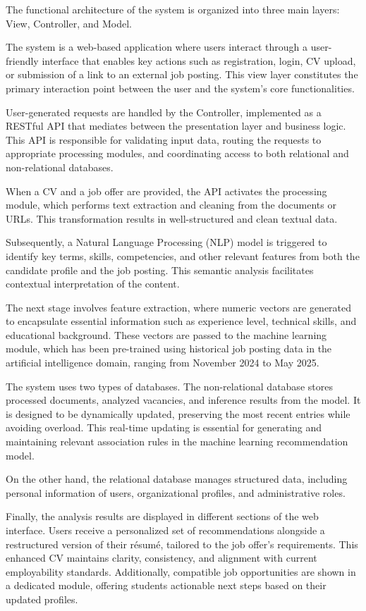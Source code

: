 \documentclass[runningheads]{llncs}
\begin{document}
	The functional architecture of the system is organized into three main layers: View, Controller, and Model.
	
	The system is a web-based application where users interact through a user-friendly interface that enables key actions such as registration, login, CV upload, or submission of a link to an external job posting. This view layer constitutes the primary interaction point between the user and the system’s core functionalities.
	
	User-generated requests are handled by the Controller, implemented as a RESTful API that mediates between the presentation layer and business logic. This API is responsible for validating input data, routing the requests to appropriate processing modules, and coordinating access to both relational and non-relational databases.
	
	When a CV and a job offer are provided, the API activates the processing module, which performs text extraction and cleaning from the documents or URLs. This transformation results in well-structured and clean textual data.
	
	Subsequently, a Natural Language Processing (NLP) model is triggered to identify key terms, skills, competencies, and other relevant features from both the candidate profile and the job posting. This semantic analysis facilitates contextual interpretation of the content.
	
	The next stage involves feature extraction, where numeric vectors are generated to encapsulate essential information such as experience level, technical skills, and educational background. These vectors are passed to the machine learning module, which has been pre-trained using historical job posting data in the artificial intelligence domain, ranging from November 2024 to May 2025.
	
	The system uses two types of databases. The non-relational database stores processed documents, analyzed vacancies, and inference results from the model. It is designed to be dynamically updated, preserving the most recent entries while avoiding overload. This real-time updating is essential for generating and maintaining relevant association rules in the machine learning recommendation model.
	
	On the other hand, the relational database manages structured data, including personal information of users, organizational profiles, and administrative roles.
	
	Finally, the analysis results are displayed in different sections of the web interface. Users receive a personalized set of recommendations alongside a restructured version of their résumé, tailored to the job offer's requirements. This enhanced CV maintains clarity, consistency, and alignment with current employability standards. Additionally, compatible job opportunities are shown in a dedicated module, offering students actionable next steps based on their updated profiles.
	
\end{document}
